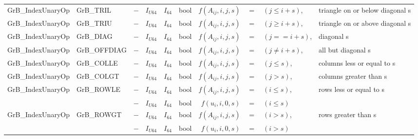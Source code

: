 \begin{landscape}
\begin{table}
\begin{threeparttable}
\begin{tabular}{l|l|cccc|rcll}
{\sf GrB\_IndexUnaryOp}   & {\sf GrB\_TRIL}    & $-$ & $I_{U64}$ & $I_{64}$ & {\sf bool} & $f(A_{ij},i,j,s)$ & $=$ & $(j \leq i + s)$, & triangle on or below diagonal s \\
{\sf GrB\_IndexUnaryOp}   & {\sf GrB\_TRIU}    & $-$ & $I_{U64}$ & $I_{64}$ & {\sf bool} & $f(A_{ij},i,j,s)$ & $=$ & $(j \geq i + s)$, & triangle on or above diagonal s \\
{\sf GrB\_IndexUnaryOp}   & {\sf GrB\_DIAG}    & $-$ & $I_{U64}$ & $I_{64}$ & {\sf bool} & $f(A_{ij},i,j,s)$ & $=$ & $(j  ==  i + s)$, & diagonal s \\
{\sf GrB\_IndexUnaryOp}   & {\sf GrB\_OFFDIAG} & $-$ & $I_{U64}$ & $I_{64}$ & {\sf bool} & $f(A_{ij},i,j,s)$ & $=$ & $(j \neq i + s)$, & all but diagonal s \\

{\sf GrB\_IndexUnaryOp}   & {\sf GrB\_COLLE}   & $-$ & $I_{U64}$ & $I_{64}$ & {\sf bool} & $f(A_{ij},i,j,s)$ & $=$ & $(j \leq s)$, & columns less or equal to s \\
{\sf GrB\_IndexUnaryOp}   & {\sf GrB\_COLGT}   & $-$ & $I_{U64}$ & $I_{64}$ & {\sf bool} & $f(A_{ij},i,j,s)$ & $=$ & $(j >    s)$, & columns greater than s \\
{\sf GrB\_IndexUnaryOp}   & {\sf GrB\_ROWLE}   & $-$ & $I_{U64}$ & $I_{64}$ & {\sf bool} & $f(A_{ij},i,j,s)$ & $=$ & $(i \leq s)$, & rows less or equal to s \\
                          &                    & $-$ & $I_{U64}$ & $I_{64}$ & {\sf bool} & $f(u_{i}, i,0,s)$ & $=$ & $(i \leq s)$  \\
{\sf GrB\_IndexUnaryOp}   & {\sf GrB\_ROWGT}   & $-$ & $I_{U64}$ & $I_{64}$ & {\sf bool} & $f(A_{ij},i,j,s)$ & $=$ & $(i >    s)$, & rows greater than s \\
                          &                    & $-$ & $I_{U64}$ & $I_{64}$ & {\sf bool} & $f(u_{i}, i,0,s)$ & $=$ & $(i >    s)$ \\
\hline
                     

\end{tabular}
\end{threeparttable}
\end{table}
\end{landscape}
